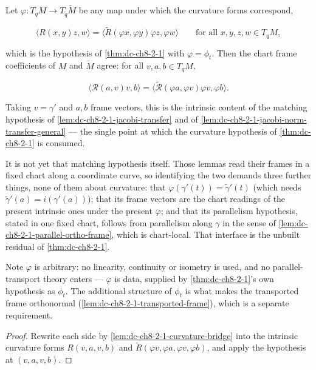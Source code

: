 \begin{lemma}
  \label{lem:dc-ch8-2-1-hmatch-transfer}


  Let $\varphi:T_qM\to T_{\tilde q}\tilde M$ be any map under which the curvature forms
  correspond,

  $$
  \langle R(x,y)z,w\rangle=\big\langle\tilde R(\varphi x,\varphi y)\varphi z,\varphi w\big\rangle
  \qquad\text{for all }x,y,z,w\in T_qM ,
  $$

  which is the hypothesis of \cref{thm:dc-ch8-2-1} with $\varphi=\phi_t$. Then the chart frame
  coefficients of $M$ and $\tilde M$ agree: for all $v,a,b\in T_qM$,

  $$
  \langle\mathcal R(a,v)v,b\rangle=\big\langle\tilde{\mathcal R}(\varphi a,\varphi v)\varphi v,
  \varphi b\big\rangle .
  $$

  Taking $v=\gamma'$ and $a,b$ frame vectors, this is the intrinsic content of the matching
  hypothesis of \cref{lem:dc-ch8-2-1-jacobi-transfer} and of
  \cref{lem:dc-ch8-2-1-jacobi-norm-transfer-general} --- the single point at which the
  curvature hypothesis of \cref{thm:dc-ch8-2-1} is consumed.

  It is not yet that matching hypothesis itself. Those lemmas read
  their frames in a fixed chart along a coordinate curve, so identifying the two demands three
  further things, none of them about curvature: that $\varphi(\gamma'(t))=\tilde\gamma'(t)$
  (which needs $\tilde\gamma'(a)=i(\gamma'(a))$); that its frame vectors are the chart
  readings of the present intrinsic ones under the present $\varphi$; and that its
  parallelism hypothesis, stated in one fixed chart, follows from parallelism along
  $\gamma$ in the sense of \cref{lem:dc-ch8-2-1-parallel-ortho-frame}, which is chart-local.
  That interface is the unbuilt residual of \cref{thm:dc-ch8-2-1}.

  Note $\varphi$ is arbitrary: no linearity, continuity or isometry is used, and no
  parallel-transport theory enters --- $\varphi$ is data, supplied by \cref{thm:dc-ch8-2-1}'s
  own hypothesis as $\phi_t$. The additional structure of $\phi_t$ is what makes the
  transported frame orthonormal (\cref{lem:dc-ch8-2-1-transported-frame}), which is a separate
  requirement.
\end{lemma}
\begin{proof}

\sketch
  Rewrite each side by \cref{lem:dc-ch8-2-1-curvature-bridge} into the intrinsic curvature
  forms $R(v,a,v,b)$ and $\tilde R(\varphi v,\varphi a,\varphi v,\varphi b)$, and apply the
  hypothesis at $(v,a,v,b)$.
\end{proof}

